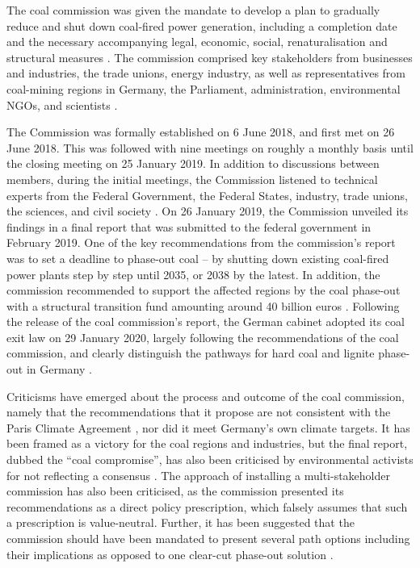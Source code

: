 \documentclass[12pt,onecolumn,twoside]{layout}
\begin{document}
The coal commission was given the mandate to develop a plan to gradually reduce and shut down coal-fired power generation, including a completion date and the necessary accompanying legal, economic, social, renaturalisation and structural measures \citep{Groll2019}. The commission comprised key stakeholders from businesses and industries, the trade unions, energy industry, as well as representatives from coal-mining regions in Germany, the Parliament, administration, environmental NGOs, and scientists \citep{AgoraEnergiewende2019}.

The Commission was formally established on 6 June 2018, and first met on 26 June 2018. This was followed with nine meetings on roughly a monthly basis until the closing meeting on 25 January 2019. In addition to discussions between members, during the initial meetings, the Commission listened to technical experts from the Federal Government, the Federal States, industry, trade unions, the sciences, and civil society \citep{Wehrmann2018}. On 26 January 2019, the Commission unveiled its findings in a final report that was submitted to the federal government in February 2019. One of the key recommendations from the commission's report was to set a deadline to phase-out coal -- by shutting down existing coal-fired power plants step by step until 2035, or 2038 by the latest. In addition, the commission recommended to support the affected regions by the coal phase-out with a structural transition fund amounting around 40 billion euros \citep{Egenter2019}. Following the release of the coal commission's report, the German cabinet adopted its coal exit law on 29 January 2020, largely following the recommendations of the coal commission, and clearly distinguish the pathways for hard coal and lignite phase-out in Germany \citep{Wettengel2020}.

Criticisms have emerged about the process and outcome of the coal commission, namely that the recommendations that it propose are not consistent with the Paris Climate Agreement \citep{klimareporter2019a}, nor did it meet Germany's own climate targets. It has been framed as a victory for the coal regions and industries, but the final report, dubbed the ``coal compromise'', has also been criticised by environmental activists for not reflecting a consensus \citep{klimareporter2019,endegelaende2019}. The approach of installing a multi-stakeholder commission has also been criticised, as the commission presented its recommendations as a direct policy prescription, which falsely assumes that such a prescription is value-neutral. Further, it has been suggested that the commission should have been mandated to present several path options including their implications as opposed to one clear-cut phase-out solution \citep{Kowarsch2019}.
\end{document}
